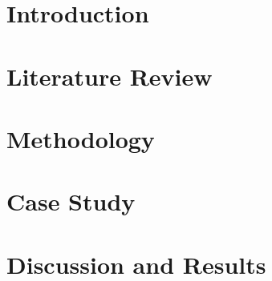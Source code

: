 \documentclass{polimi_template_classic/PoliMi3i_thesis}
\begin{document}
\chapter*{Introduction} 


\chapter{Literature Review} %


\chapter{Methodology} %


\chapter{Case Study} %
\label{sec:case_study}

\chapter{Discussion and Results} %
\label{sec:final}


\nocite{*} %
\printbibliography
\end{document}
